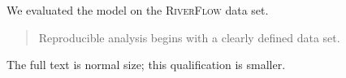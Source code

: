 \documentclass[11pt]{article}
\newcommand{\dataset}{\textsc{RiverFlow}}
\begin{document}
We evaluated the model on the \dataset{} data set.

\begin{quote}
Reproducible analysis begins with a clearly defined data set.
\end{quote}

The full text is normal size; {\small this qualification is smaller}.
\end{document}
